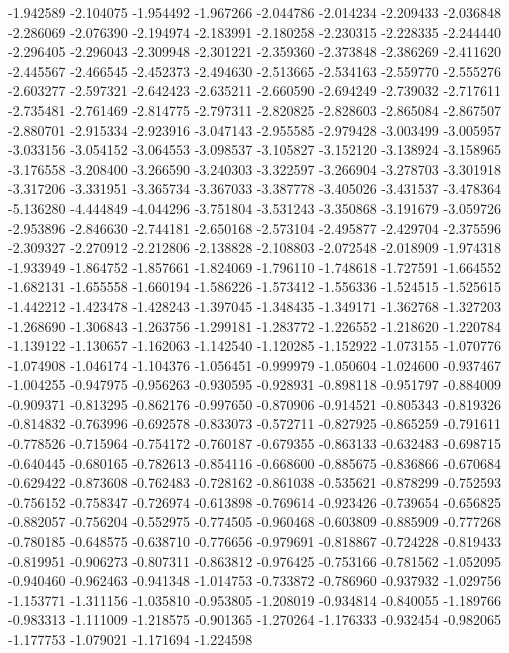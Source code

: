 -1.942589
-2.104075
-1.954492
-1.967266
-2.044786
-2.014234
-2.209433
-2.036848
-2.286069
-2.076390
-2.194974
-2.183991
-2.180258
-2.230315
-2.228335
-2.244440
-2.296405
-2.296043
-2.309948
-2.301221
-2.359360
-2.373848
-2.386269
-2.411620
-2.445567
-2.466545
-2.452373
-2.494630
-2.513665
-2.534163
-2.559770
-2.555276
-2.603277
-2.597321
-2.642423
-2.635211
-2.660590
-2.694249
-2.739032
-2.717611
-2.735481
-2.761469
-2.814775
-2.797311
-2.820825
-2.828603
-2.865084
-2.867507
-2.880701
-2.915334
-2.923916
-3.047143
-2.955585
-2.979428
-3.003499
-3.005957
-3.033156
-3.054152
-3.064553
-3.098537
-3.105827
-3.152120
-3.138924
-3.158965
-3.176558
-3.208400
-3.266590
-3.240303
-3.322597
-3.266904
-3.278703
-3.301918
-3.317206
-3.331951
-3.365734
-3.367033
-3.387778
-3.405026
-3.431537
-3.478364
-5.136280
-4.444849
-4.044296
-3.751804
-3.531243
-3.350868
-3.191679
-3.059726
-2.953896
-2.846630
-2.744181
-2.650168
-2.573104
-2.495877
-2.429704
-2.375596
-2.309327
-2.270912
-2.212806
-2.138828
-2.108803
-2.072548
-2.018909
-1.974318
-1.933949
-1.864752
-1.857661
-1.824069
-1.796110
-1.748618
-1.727591
-1.664552
-1.682131
-1.655558
-1.660194
-1.586226
-1.573412
-1.556336
-1.524515
-1.525615
-1.442212
-1.423478
-1.428243
-1.397045
-1.348435
-1.349171
-1.362768
-1.327203
-1.268690
-1.306843
-1.263756
-1.299181
-1.283772
-1.226552
-1.218620
-1.220784
-1.139122
-1.130657
-1.162063
-1.142540
-1.120285
-1.152922
-1.073155
-1.070776
-1.074908
-1.046174
-1.104376
-1.056451
-0.999979
-1.050604
-1.024600
-0.937467
-1.004255
-0.947975
-0.956263
-0.930595
-0.928931
-0.898118
-0.951797
-0.884009
-0.909371
-0.813295
-0.862176
-0.997650
-0.870906
-0.914521
-0.805343
-0.819326
-0.814832
-0.763996
-0.692578
-0.833073
-0.572711
-0.827925
-0.865259
-0.791611
-0.778526
-0.715964
-0.754172
-0.760187
-0.679355
-0.863133
-0.632483
-0.698715
-0.640445
-0.680165
-0.782613
-0.854116
-0.668600
-0.885675
-0.836866
-0.670684
-0.629422
-0.873608
-0.762483
-0.728162
-0.861038
-0.535621
-0.878299
-0.752593
-0.756152
-0.758347
-0.726974
-0.613898
-0.769614
-0.923426
-0.739654
-0.656825
-0.882057
-0.756204
-0.552975
-0.774505
-0.960468
-0.603809
-0.885909
-0.777268
-0.780185
-0.648575
-0.638710
-0.776656
-0.979691
-0.818867
-0.724228
-0.819433
-0.819951
-0.906273
-0.807311
-0.863812
-0.976425
-0.753166
-0.781562
-1.052095
-0.940460
-0.962463
-0.941348
-1.014753
-0.733872
-0.786960
-0.937932
-1.029756
-1.153771
-1.311156
-1.035810
-0.953805
-1.208019
-0.934814
-0.840055
-1.189766
-0.983313
-1.111009
-1.218575
-0.901365
-1.270264
-1.176333
-0.932454
-0.982065
-1.177753
-1.079021
-1.171694
-1.224598
